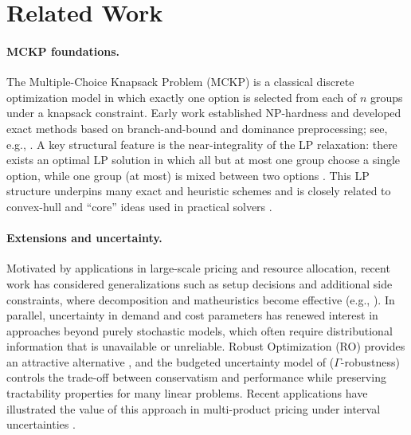 \documentclass[11pt, a4paper]{article}
\theoremstyle{plain}
\theoremstyle{definition}
\theoremstyle{remark}
\begin{document}
\section{Related Work}
\label{sec:related_work}

\paragraph{MCKP foundations.}
The Multiple-Choice Knapsack Problem (MCKP) is a classical discrete optimization model in which exactly one option is selected from each of $n$
groups under a knapsack constraint. Early work established NP-hardness and developed exact methods based on branch-and-bound and dominance
preprocessing; see, e.g., \citet{Nauss1978,Ibaraki1978,Sinha1979}. A key structural feature is the near-integrality of the LP relaxation:
there exists an optimal LP solution in which all but at most one group choose a single option, while one group (at most) is mixed between
two options \citep{Dyer1984}. This LP structure underpins many exact and heuristic schemes and is closely related to convex-hull and ``core''
ideas used in practical solvers \citep{Pisinger1995,Kellerer2004}.

\paragraph{Extensions and uncertainty.}
Motivated by applications in large-scale pricing and resource allocation, recent work has considered generalizations such as setup decisions
and additional side constraints, where decomposition and matheuristics become effective (e.g., \citealp{Boukhari2023,Boukhari2024}). In
parallel, uncertainty in demand and cost parameters has renewed interest in approaches beyond purely stochastic models, which often require
distributional information that is unavailable or unreliable. Robust Optimization (RO) provides an attractive alternative \citep{BenTal1999},
and the budgeted uncertainty model of \citet{BertsimasSim2004} ($\Gamma$-robustness) controls the trade-off between conservatism and performance
while preserving tractability properties for many linear problems. Recent applications have illustrated the value of this approach in multi-product
pricing under interval uncertainties \citep{Hamzeei2022}.
\end{document}
